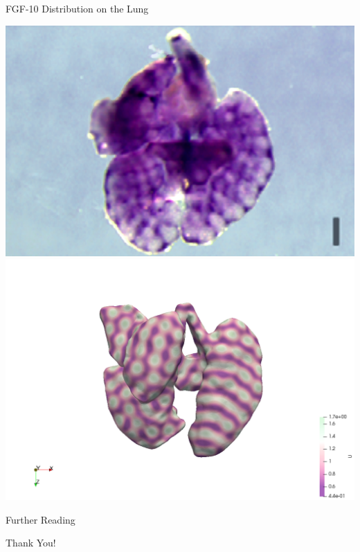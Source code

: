 \documentclass{beamer}
\begin{document}
   		\begin{frame}{FGF-10 Distribution on the Lung}
   		
   		\includegraphics[width=.45\linewidth,trim=4cm 0 4cm 0, clip, frame]{images/mouse-lung-E13.5}\cite{Volckaert2013} \hfill
   		\includegraphics[width=.5\linewidth, trim=10cm 5cm 10cm 5cm, clip]{images/lung_example2.png}
   		
   		\end{frame}
            
            
            \appendix
            
            \begin{frame}{Further Reading}
                \nocite{*}
                
                
            \end{frame}
    
            \begin{frame}[focus]
                \huge Thank You!
            \end{frame}

    
\end{document}
